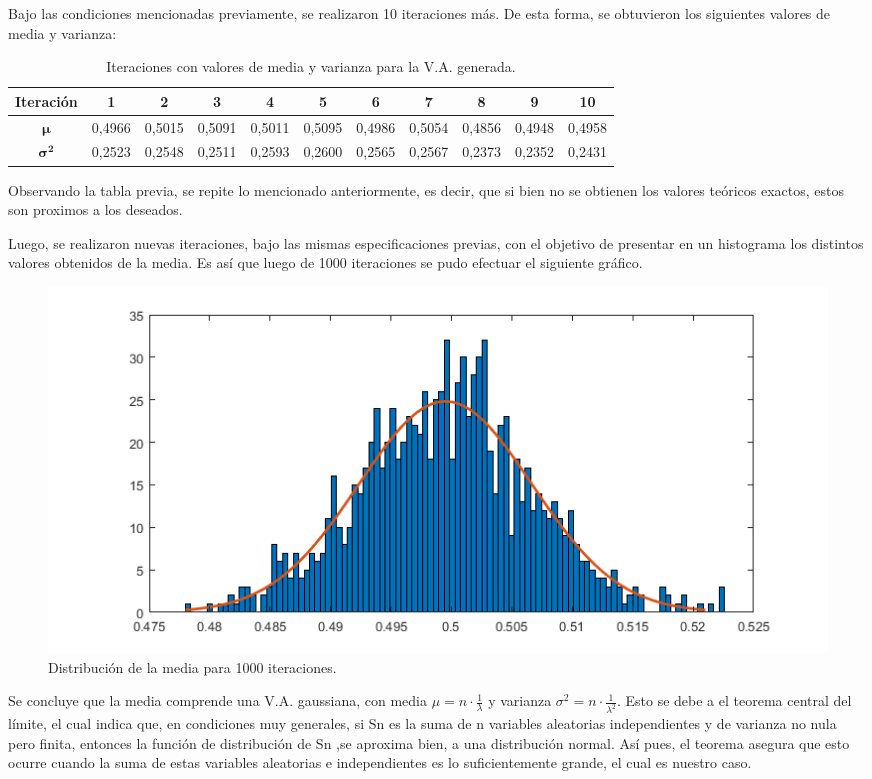 Bajo las condiciones mencionadas previamente, se realizaron 10 iteraciones más. De esta forma, se obtuvieron los siguientes valores de media y varianza:
\begin{table}[H]
\centering
\begin{tabular}{ccccccccccc}
\hline
\textbf{Iteración}      & \textbf{1} & \textbf{2} & \textbf{3} & \textbf{4} & \textbf{5} & \textbf{6} & \textbf{7} & \textbf{8} & \textbf{9} & \textbf{10} \\ \hline
$\mathbf{\mu}$          & 0,4966     & 0,5015     & 0,5091     & 0,5011     & 0,5095     & 0,4986     & 0,5054     & 0,4856     & 0,4948     & 0,4958      \\
$\mathbf{{\sigma}^{2}}$ & 0,2523     & 0,2548     & 0,2511     & 0,2593     & 0,2600     & 0,2565     & 0,2567     & 0,2373     & 0,2352     & 0,2431     \\ \hline
\end{tabular}
\caption{Iteraciones con valores de media y varianza para la V.A. generada.}
\end{table}

Observando la tabla previa, se repite lo mencionado anteriormente, es decir, que si bien no se obtienen los valores teóricos exactos, estos son proximos a los deseados.

Luego, se realizaron nuevas iteraciones, bajo las mismas especificaciones previas, con el objetivo de presentar en un histograma los distintos valores obtenidos de la media. Es así que luego de 1000 iteraciones se pudo efectuar el siguiente gráfico.
\begin{figure}[H]
	\centering
	\includegraphics[width=0.8\linewidth]{./ImagenesEjercicio1/Media-1.png}
	\caption{Distribución de la media para 1000 iteraciones.}
	\label{fig:media-mc}
\end{figure}

Se concluye que la media comprende una V.A. gaussiana, con media $\mu = n \cdot \frac{1}{\lambda}$
 y varianza $ \sigma ^2 = n \cdot \frac{1}{\lambda ^2}$. Esto se debe a el teorema central del límite, el cual  indica que, en condiciones muy generales, si Sn es la suma de n
 variables aleatorias independientes y de varianza no nula pero finita, entonces la función de distribución de Sn ,se aproxima bien, a una distribución normal.
  Así pues, el teorema asegura que esto ocurre cuando la suma de
   estas variables aleatorias e independientes es lo suficientemente grande, el cual es nuestro caso.

